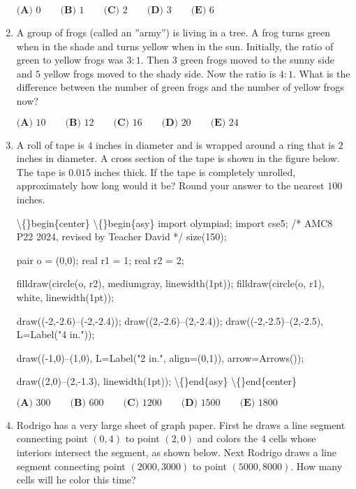 \documentclass{article}
\begin{document}
\begin{enumerate}[label=\arabic*., itemsep=0.5em]
\(\textbf{(A) }0\qquad\textbf{(B) }1\qquad\textbf{(C) }2\qquad\textbf{(D) }3\qquad\textbf{(E) }6\)\par \vspace{0.5em}\item A group of frogs (called an ''army'') is living in a tree. A frog turns green when in the shade and turns yellow
when in the sun. Initially, the ratio of green to yellow frogs was \(3 : 1\). Then \(3\) green frogs moved to the
sunny side and \(5\) yellow frogs moved to the shady side. Now the ratio is \(4 : 1\). What is the difference
between the number of green frogs and the number of yellow frogs now?

\(\textbf{(A) } 10\qquad\textbf{(B) } 12\qquad\textbf{(C) } 16\qquad\textbf{(D) } 20\qquad\textbf{(E) } 24\)\par \vspace{0.5em}\item A  roll of tape is \(4\) inches in diameter and is wrapped around a ring that is \(2\) inches in diameter. A cross section of the tape is shown in the figure below. The tape is \(0.015\) inches thick. If the tape is completely unrolled, approximately how long would it be? Round your answer to the nearest \(100\) inches.


\textbackslash\{\}begin\{center\}
\textbackslash\{\}begin\{asy\}
import olympiad;
import cse5;
/* AMC8 P22 2024, revised by Teacher David */
size(150);

pair o = (0,0);
real r1 = 1;
real r2 = 2;

filldraw(circle(o, r2), mediumgray, linewidth(1pt));
filldraw(circle(o, r1), white, linewidth(1pt));

draw((-2,-2.6)--(-2,-2.4));
draw((2,-2.6)--(2,-2.4));
draw((-2,-2.5)--(2,-2.5), L=Label("4 in."));

draw((-1,0)--(1,0), L=Label("2 in.", align=(0,1)), arrow=Arrows());

draw((2,0)--(2,-1.3), linewidth(1pt));
\textbackslash\{\}end\{asy\}
\textbackslash\{\}end\{center\}


\(\textbf{(A) } 300\qquad\textbf{(B) } 600\qquad\textbf{(C) } 1200\qquad\textbf{(D) } 1500\qquad\textbf{(E) } 1800\)\par \vspace{0.5em}\item Rodrigo has a very large sheet of graph paper. First he draws a line segment connecting point \((0,4)\) to point \((2,0)\) and colors the \(4\) cells whose interiors intersect the segment, as shown below. Next Rodrigo draws a line segment connecting point \((2000,3000)\) to point \((5000,8000)\). How many cells will he color this time?



\end{enumerate}
\end{document}
